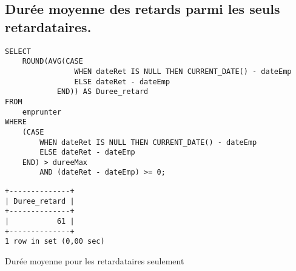 \documentclass{article}
\begin{document}
\subsection{Durée moyenne des retards parmi les seuls retardataires.}
\begin{center}
\begin{minipage}{0.7\linewidth}
\begin{listing}[H]
\begin{verbatim}
SELECT 
    ROUND(AVG(CASE
                WHEN dateRet IS NULL THEN CURRENT_DATE() - dateEmp
                ELSE dateRet - dateEmp
            END)) AS Duree_retard
FROM
    emprunter
WHERE
    (CASE
        WHEN dateRet IS NULL THEN CURRENT_DATE() - dateEmp
        ELSE dateRet - dateEmp
    END) > dureeMax
        AND (dateRet - dateEmp) >= 0;
\end{verbatim}
\begin{verbatim}
+--------------+
| Duree_retard |
+--------------+
|           61 |
+--------------+
1 row in set (0,00 sec)
\end{verbatim}
\caption{Durée moyenne pour les retardataires seulement}
\end{listing}
\end{minipage}
\end{center}
\end{document}
